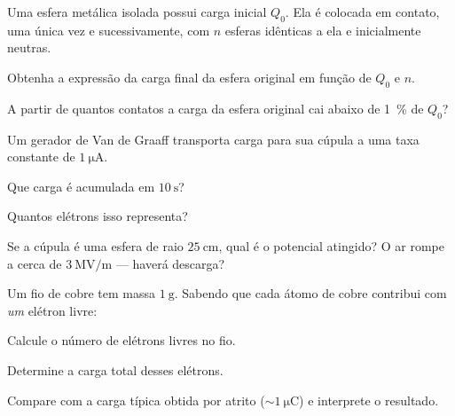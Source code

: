 \begin{questao}[3]{}

Uma esfera metálica isolada possui carga inicial $Q_0$. Ela é colocada em contato,
uma única vez e sucessivamente, com $n$ esferas idênticas a ela e inicialmente
neutras.
\begin{itensq}
\item Obtenha a expressão da carga final da esfera original em função de $Q_0$ e $n$.
\item A partir de quantos contatos a carga da esfera original cai abaixo de
      \SI{1}{\percent} de $Q_0$?
\end{itensq}


\end{questao}
\begin{questao}[3]{}

Um gerador de Van de Graaff transporta carga para sua cúpula a uma taxa
constante de $\SI{1}{\micro\ampere}$.
\begin{itensq}
\item Que carga é acumulada em $\SI{10}{\second}$?
\item Quantos elétrons isso representa?
\item Se a cúpula é uma esfera de raio $\SI{25}{\centi\meter}$, qual é o potencial
      atingido? O ar rompe a cerca de $\SI{3}{\mega\volt\per\meter}$ --- haverá
      descarga?
\end{itensq}


\end{questao}
\begin{questao}[3]{}

Um fio de cobre tem massa $\SI{1}{\gram}$. Sabendo que cada átomo de cobre
contribui com \emph{um} elétron livre:
\begin{itensq}
\item Calcule o número de elétrons livres no fio.
\item Determine a carga total desses elétrons.
\item Compare com a carga típica obtida por atrito ($\sim\SI{1}{\micro\coulomb}$)
      e interprete o resultado.
\end{itensq}


\end{questao}

